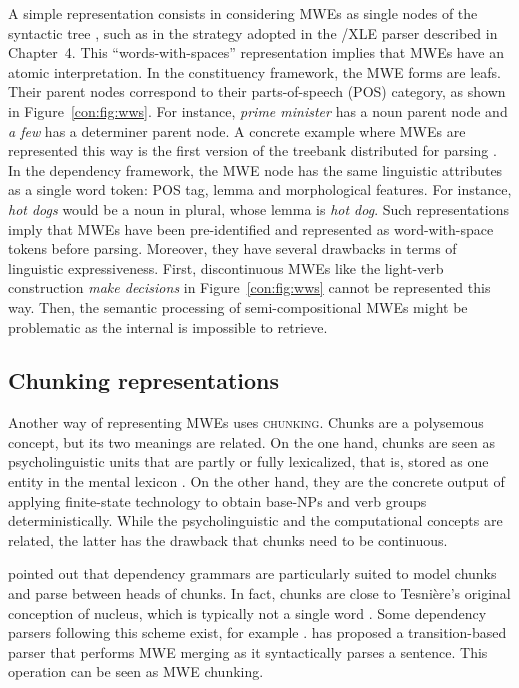 \documentclass[output=paper]{langsci/langscibook}
\begin{document}
A simple representation consists in considering MWEs as single nodes of the syntactic tree \citep{sag02}, such as in the strategy adopted in the /XLE parser described in Chapter~4. This ``words-with-spaces'' representation implies that MWEs have an atomic interpretation. In the constituency framework, the MWE forms are leafs. Their parent nodes correspond to their parts-of-speech (POS) category, as shown in Figure~\ref{con:fig:wws}. For instance, \textit{prime minister} has a noun parent node and \textit{a few} has a determiner parent node. 
A concrete example where MWEs are represented this way is the first version of the  treebank distributed for parsing \citep{candito:2009}. 
In the dependency framework, the MWE node has the same linguistic attributes as a single word token: POS tag, lemma and morphological features. For instance, \textit{hot dogs} would be a noun in plural, whose lemma is \textit{hot dog}. Such representations imply that MWEs have been pre-identified and represented as word-with-space tokens before parsing. Moreover, they have several drawbacks in terms of linguistic expressiveness. First, discontinuous MWEs like the light-verb construction \textit{make decisions} in Figure~\ref{con:fig:wws} cannot be represented this way. Then, the semantic processing of semi-compositional MWEs might be problematic as the internal  is impossible to retrieve.%

\subsection {Chunking representations}
\label{con:ssec:chunking}

Another way of representing MWEs uses \textsc{chunking}. 
Chunks are a polysemous concept, but its two meanings are related. 
On the one hand, chunks are seen as psycholinguistic units that are partly or fully lexicalized, that is, stored as one entity in the mental lexicon \citep{miller56,pawley-syder83,tomasello98,wray08}. 
On the other hand, they are 
the concrete output of applying finite-state technology to obtain base-NPs and verb groups deterministically. While the psycholinguistic and the computational concepts are related, the latter has the drawback that chunks need to be continuous.

\citet{abney1991procedure} pointed out that dependency grammars are particularly suit\-ed to model chunks and parse between heads of chunks. 
In fact, chunks are close to Tesnière's original conception of nucleus, which is typically not a single word \citep{tesniere:1959}. Some dependency parsers following this scheme exist, for example \citet{schneiderphd}. \citet{nivre:2014} has proposed a transition-based parser that performs MWE merging as it syntactically parses a sentence. This operation can be seen as MWE chunking. 
\end{document}
